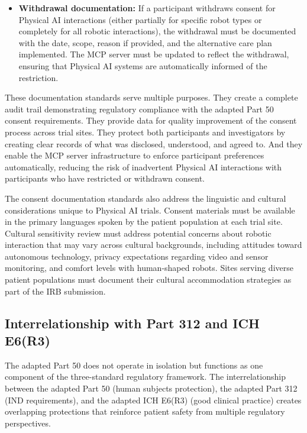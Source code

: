 \begin{itemize}
    \item \textbf{Withdrawal documentation:} If a participant withdraws consent
    for Physical AI interactions (either partially for specific robot types or
    completely for all robotic interactions), the withdrawal must be documented
    with the date, scope, reason if provided, and the alternative care plan
    implemented. The MCP server must be updated to reflect the withdrawal,
    ensuring that Physical AI systems are automatically informed of the
    restriction.
\end{itemize}

These documentation standards serve multiple purposes. They create a complete
audit trail demonstrating regulatory compliance with the adapted Part 50
consent requirements. They provide data for quality improvement of the consent
process across trial sites. They protect both participants and investigators by
creating clear records of what was disclosed, understood, and agreed to. And
they enable the MCP server infrastructure to enforce participant preferences
automatically, reducing the risk of inadvertent Physical AI interactions with
participants who have restricted or withdrawn consent.

The consent documentation standards also address the linguistic and cultural
considerations unique to Physical AI trials. Consent materials must be
available in the primary languages spoken by the patient population at each
trial site. Cultural sensitivity review must address potential concerns about
robotic interaction that may vary across cultural backgrounds, including
attitudes toward autonomous technology, privacy expectations regarding video
and sensor monitoring, and comfort levels with human-shaped robots. Sites
serving diverse patient populations must document their cultural accommodation
strategies as part of the IRB submission.

\subsection{Interrelationship with Part 312 and ICH E6(R3)}
\label{subsec:cfr50-interrelationship}

The adapted Part 50 does not operate in isolation but functions as one
component of the three-standard regulatory framework. The interrelationship
between the adapted Part 50 (human subjects protection), the adapted Part 312
(IND requirements), and the adapted ICH E6(R3) (good clinical practice) creates
overlapping protections that reinforce patient safety from multiple regulatory
perspectives.

